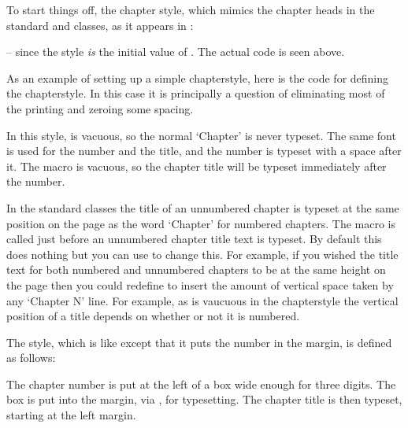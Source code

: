    To start things off,  the  chapter
style, which mimics the chapter heads in the standard  and 
 classes, as it appears in :
\begin{lcode}
\end{lcode}
-- since the  style \emph{is} the initial value of
\cmd{\makechapterstyle}. The actual code is seen above. 



    As an example of setting up a simple chapterstyle, here is the code for 
defining the  chapterstyle. In this case it is principally
a question of eliminating most of the printing and zeroing some spacing.
\begin{lcode}
\end{lcode}
In this style, \cmd{\printchaptername} is vacuous, so the normal `Chapter'
is never typeset. The same font is used for the number and the title, and
the number is typeset with a space after it. The macro \cmd{\afterchapternum}
is vacuous, so the chapter title will be typeset immediately after the number.

    In the standard classes the title of an unnumbered chapter is typeset
at the same position on the page as the word `Chapter' for numbered chapters.
The macro \cmd{\printchapternonum} is called just before an unnumbered 
chapter title text is typeset. By default this does nothing but you can use
\cmd{\renewcommand} to change this. For example, if you wished the title
text for both numbered and unnumbered chapters to be at the same height on
the page then you could redefine \cmd{\printchapternonum} to insert
the amount of vertical space taken by any `Chapter N' line. For example,
as \cmd{\printchapternonum} is vaucuous in the  chapterstyle
the vertical position of a title depends on whether or not it is numbered.

The  style, which is like  except that it
puts the number in the margin, is defined as follows:
\begin{lcode}
\end{lcode}
The chapter number is put at the left of a box wide enough for three digits.
The box is put into the margin, via \cmd{\llap}, for typesetting. The
chapter title is then typeset, starting at the left margin.

